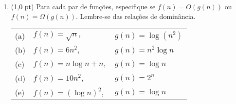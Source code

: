 \documentclass[a4paper,10pt]{article}
\begin{document}
\begin{multicols*}{2}
\begin{enumerate}
  \item (1,0 pt) Para cada par de funções, especifique se $ f(n) = O(g(n)) $ ou $ f(n) = \Omega(g(n)) $. Lembre-se das relações de dominância.

  \bigskip

  \setlength{\tabcolsep}{2pt}

  \begin{tabular}{@{\hskip 2mm}lll}
    (a) & $ f(n) = \sqrt{n}, $ & $ g(n) = \log{(n^2)} $ \\[0.4em]
    (b) & $ f(n) = 6n^2, $ & $ g(n) = n^2 \log{n} $ \\[0.4em]
    (c) & $ f(n) = n \log{n} + n, $ & $ g(n) = \log{n} $ \\[0.4em]
    (d) & $ f(n) = 10 n^2, $ & $ g(n) = 2^n $ \\[0.4em]
    (e) & $ f(n) = (\log{n})^2, $ & $ g(n) = \log{n} $
  \end{tabular}
\end{enumerate}
\end{multicols*}
\end{document}
